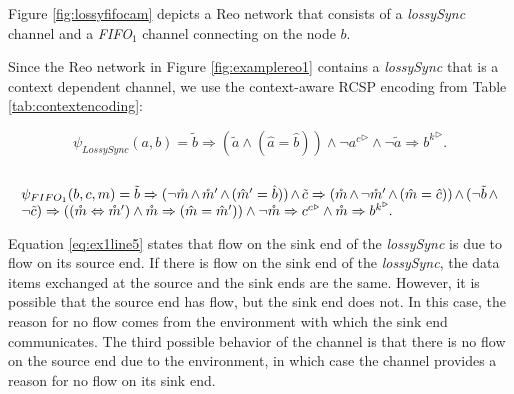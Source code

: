 \begin{BehExample}
\label{ex:contextsenniaz}
Figure \ref{fig:lossyfifocam} depicts a Reo network that consists of a \emph{lossySync} channel and a \emph{FIFO$_1$} channel connecting on the node $b$.    
\end{BehExample}

Since the Reo network in Figure \ref{fig:examplereo1} contains a \emph{lossySync} that is a context dependent channel, we use the context-aware RCSP encoding from Table \ref{tab:contextencoding}: %

\begin{equation}
\label{eq:ex1line5}
\psi_{LossySync}(a, b) = \tilde{b} \Rightarrow (\tilde{a} \wedge (\hat{a}=\hat{b})) \wedge \neg {a^c}^\triangleright \wedge \neg \tilde{a} \Rightarrow {b^k}^\triangleright. 
\end{equation} \\
\begin{equation}
\label{eq:ex1line7}
\parbox{.99\columnwidth}{$\psi_{FIFO_{1}}(b, c, m)  = \tilde{b} \Rightarrow (\neg \mathring{m} \wedge \mathring{m}' \wedge (\hat{m}'=\hat{b})) \wedge \tilde{c} \Rightarrow (\mathring{m} \wedge \neg \mathring{m}' \wedge (\hat{m}=\hat{c})) \wedge (\neg \tilde{b} \wedge \neg \tilde{c}) \Rightarrow ((\mathring{m} \Leftrightarrow \mathring{m}') \wedge \mathring{m} \Rightarrow (\hat{m}=\hat{m}')) %
\wedge \neg \mathring{m} \Rightarrow {c^c}^\triangleright \wedge  \mathring{m} \Rightarrow {b^k}^\triangleright.
 $}
\end{equation}


Equation \ref{eq:ex1line5} states that flow on the sink end of the \emph{lossySync} is due to flow on its source end. If there is flow on the sink end of the \emph{lossySync}, the data items exchanged at the source and the sink ends are the same. However, it is possible that the source end has  flow, but the sink end does not. In this case, the reason for no flow comes from the environment with which the sink end communicates. The third possible behavior of the channel is that there is no flow on the source end due to the environment, in which case the channel provides a reason for no flow on its sink end.

